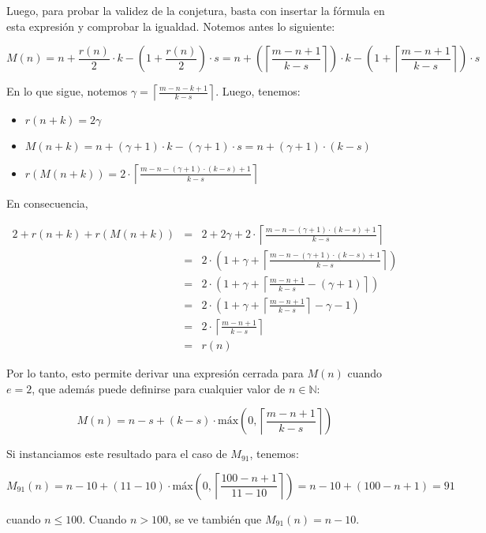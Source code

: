 \documentclass[a4paper,10pt]{article}
\newcommand{\Mc}[1]{\ensuremath{M_{91}(#1)}}
\newcommand{\Nat}{\ensuremath{\mathbb{N}}}
\newcommand{\ceil}[1]{\ensuremath{\left\lceil #1 \right\rceil}}
\begin{document}
Luego, para probar la validez de la conjetura, basta con insertar la f\'ormula en esta expresi\'on y 
comprobar la igualdad. Notemos antes lo siguiente:

$$M(n) = n + \frac{r(n)}{2} \cdot k - \left(1 + \frac{r(n)}{2}\right) \cdot s 
       = n + \left( \ceil{\frac{m-n+1}{k-s}} \right) \cdot k - \left(1 + \ceil{\frac{m-n+1}{k-s}} \right) \cdot s$$

En lo que sigue, notemos $\gamma = \ceil{\frac{m-n-k+1}{k-s}}$. Luego, tenemos:

\begin{itemize}
    \item $r(n+k) = 2 \gamma$
    \item $M(n+k) = n + (\gamma + 1) \cdot k - (\gamma + 1) \cdot s = n + (\gamma + 1) \cdot (k-s)$
    \item $r(M(n+k)) = 2 \cdot \ceil{\frac{m - n - (\gamma + 1) \cdot (k-s) + 1}{k-s}}$
\end{itemize}

En consecuencia,

\begin{eqnarray*}
2 + r(n+k) + r(M(n+k)) &=& 2 + 2 \gamma + 2 \cdot \ceil{\frac{m - n - (\gamma + 1) \cdot (k-s) + 1}{k-s}} \\
                       &=& 2 \cdot \left(1 + \gamma + \ceil{\frac{m - n - (\gamma + 1) \cdot (k-s) + 1}{k-s}} \right) \\
                       &=& 2 \cdot \left(1 + \gamma + \ceil{\frac{m-n+1}{k-s} - (\gamma + 1)} \right) \\
                       &=& 2 \cdot \left(1 + \gamma + \ceil{\frac{m-n+1}{k-s}} - \gamma - 1 \right) \\
                       &=& 2 \cdot \ceil{\frac{m-n+1}{k-s}} \\
                       &=& r(n)
\end{eqnarray*}

Por lo tanto, esto permite derivar una expresi\'on cerrada para $M(n)$ cuando $e = 2$, que adem\'as puede
definirse para cualquier valor de $n \in \Nat$:

$$M(n) = n - s + (k - s) \cdot \text{m\'ax}\left(0, \ceil{\frac{m-n+1}{k-s}}\right)$$

Si instanciamos este resultado para el caso de $M_{91}$, tenemos:

$$\Mc{n} = n - 10 + (11 - 10) \cdot \text{m\'ax}\left(0, \ceil{\frac{100-n+1}{11-10}}\right) = n - 10 + (100 - n + 1) = 91$$

cuando $n \leq 100$. Cuando $n > 100$, se ve tambi\'en que $\Mc{n} = n - 10$.
\end{document}
